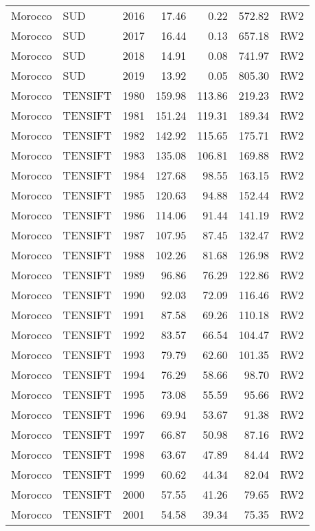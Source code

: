 \begin{longtable}{lllrrrl}
  Morocco & SUD & 2016 & 17.46 & 0.22 & 572.82 & RW2 \\ 
  Morocco & SUD & 2017 & 16.44 & 0.13 & 657.18 & RW2 \\ 
  Morocco & SUD & 2018 & 14.91 & 0.08 & 741.97 & RW2 \\ 
  Morocco & SUD & 2019 & 13.92 & 0.05 & 805.30 & RW2 \\ 
  Morocco & TENSIFT & 1980 & 159.98 & 113.86 & 219.23 & RW2 \\ 
  Morocco & TENSIFT & 1981 & 151.24 & 119.31 & 189.34 & RW2 \\ 
  Morocco & TENSIFT & 1982 & 142.92 & 115.65 & 175.71 & RW2 \\ 
  Morocco & TENSIFT & 1983 & 135.08 & 106.81 & 169.88 & RW2 \\ 
  Morocco & TENSIFT & 1984 & 127.68 & 98.55 & 163.15 & RW2 \\ 
  Morocco & TENSIFT & 1985 & 120.63 & 94.88 & 152.44 & RW2 \\ 
  Morocco & TENSIFT & 1986 & 114.06 & 91.44 & 141.19 & RW2 \\ 
  Morocco & TENSIFT & 1987 & 107.95 & 87.45 & 132.47 & RW2 \\ 
  Morocco & TENSIFT & 1988 & 102.26 & 81.68 & 126.98 & RW2 \\ 
  Morocco & TENSIFT & 1989 & 96.86 & 76.29 & 122.86 & RW2 \\ 
  Morocco & TENSIFT & 1990 & 92.03 & 72.09 & 116.46 & RW2 \\ 
  Morocco & TENSIFT & 1991 & 87.58 & 69.26 & 110.18 & RW2 \\ 
  Morocco & TENSIFT & 1992 & 83.57 & 66.54 & 104.47 & RW2 \\ 
  Morocco & TENSIFT & 1993 & 79.79 & 62.60 & 101.35 & RW2 \\ 
  Morocco & TENSIFT & 1994 & 76.29 & 58.66 & 98.70 & RW2 \\ 
  Morocco & TENSIFT & 1995 & 73.08 & 55.59 & 95.66 & RW2 \\ 
  Morocco & TENSIFT & 1996 & 69.94 & 53.67 & 91.38 & RW2 \\ 
  Morocco & TENSIFT & 1997 & 66.87 & 50.98 & 87.16 & RW2 \\ 
  Morocco & TENSIFT & 1998 & 63.67 & 47.89 & 84.44 & RW2 \\ 
  Morocco & TENSIFT & 1999 & 60.62 & 44.34 & 82.04 & RW2 \\ 
  Morocco & TENSIFT & 2000 & 57.55 & 41.26 & 79.65 & RW2 \\ 
  Morocco & TENSIFT & 2001 & 54.58 & 39.34 & 75.35 & RW2 \\ 

\end{longtable}
